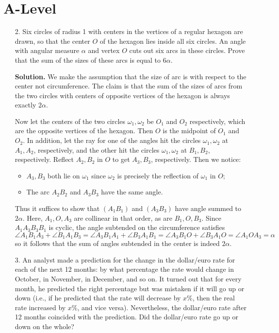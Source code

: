 \documentclass[11pt,a4paper]{article}
\begin{document}
\section*{A-Level}
\begin{enumerate}
	\item [2.]
	Six circles of radius 1 with centers in the vertices of a regular hexagon are drawn, so that
	the center $O$ of the hexagon lies inside all six circles. An angle with angular measure $\alpha$
	and vertex $O$ cuts out six arcs in these circles. Prove that the sum of the sizes of these
	arcs is equal to $6\alpha$. 
	
	\textbf{Solution.} 
	We make the assumption that the size of arc is with respect to the center not circumference. 
	The claim is that the sum of the sizes of arcs from the two circles with centers of opposite vertices of the hexagon is always exactly $2\alpha$. 
	
	Now let the centers of the two circles $\omega_1, \omega_2$ be $O_1$ and $O_2$ respectively, 
	which are the opposite vertices of the hexagon. 
	Then $O$ is the midpoint of $O_1$ and $O_2$. 
	In addition, 
	let the ray for one of the angles hit the circles $\omega_1, \omega_2$ at $A_1, A_2$, respectively, 
	and the other hit the circles $\omega_1, \omega_2$ at $B_1, B_2$, respectively. 
	Reflect $A_2, B_2$ in $O$ to get $A_3, B_3$, respectively. 
	Then we notice: 
	\begin{itemize}
		\item $A_3, B_3$ both lie on $\omega_1$ since $\omega_2$ is precisely the reflection of $\omega_1$ in $O$; 
		
		\item The arc $A_2B_2$ and $A_3B_3$ have the same angle. 
	\end{itemize}
    Thus it suffices to show that $(A_1B_1)$ and $(A_3B_3)$ have angle summed to $2\alpha$. 
    Here, $A_1, O, A_3$ are collinear in that order, 
    as are $B_1, O, B_3$. 
    Since $A_1A_3B_3B_1$ is cyclic, the angle subtended on the circumference satisfies 
    \[
    \angle A_1B_1A_3 + \angle B_1A_1B_3
    =\angle A_3B_1A_1 + \angle B_3A_1B_1
    =\angle A_3B_1O + \angle B_3A_1O
    =\angle A_1OA_3
    =\alpha
    \]
    so it follows that the sum of angles subtended in the center is indeed $2\alpha$. 
	
	\item [3.] An analyst made a prediction for the change in the dollar/euro rate for each of the next 12 months: by what percentage the rate would change in October, in November, in December, and so on. It turned out that for every month, he predicted the right percentage but was mistaken if it will go up or down (i.e., if he predicted that the rate will decrease by $x\%$, then the real rate increased by $x\%$, and vice versa). Nevertheless, the dollar/euro rate after 12 months coincided with the prediction. Did the dollar/euro rate go up or down on the whole?
	

\end{enumerate}
\end{document}
